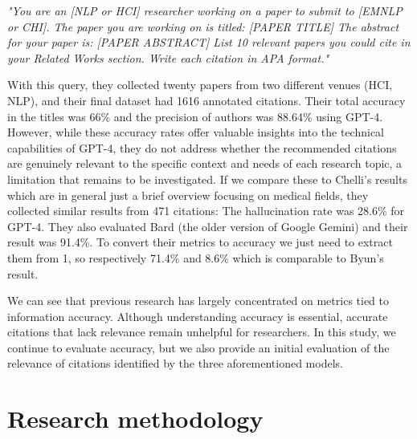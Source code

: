\documentclass[runningheads]{llncs}
\begin{document}
\textit{"You are an [NLP or HCI] researcher working on a paper to submit to [EMNLP or CHI]. 
The paper you are working on is titled: [PAPER TITLE] The abstract for your paper is: [PAPER ABSTRACT]
List 10 relevant papers you could cite in your Related Works section. Write each citation in APA format."}

With this query, they collected twenty papers from two different venues (HCI, NLP), and their final dataset had 1616 annotated citations. Their total accuracy in the titles was 66\% and the precision of authors was 88.64\% using GPT-4. However, while these accuracy rates offer valuable insights into the technical capabilities of GPT-4, they do not address whether the recommended citations are genuinely relevant to the specific context and needs of each research topic, a limitation that remains to be investigated. If we compare these to Chelli's results which are in general just a brief overview focusing on medical fields, they collected similar results from 471 citations: The hallucination rate was 28.6\% for GPT-4. They also evaluated Bard (the older version of Google Gemini) and their result was 91.4\%. To convert their metrics to accuracy we just need to extract them from 1, so respectively 71.4\% and 8.6\% which is comparable to Byun's result.

We can see that previous research has largely concentrated on metrics tied to information accuracy. Although understanding accuracy is essential, accurate citations that lack relevance remain unhelpful for researchers. In this study, we continue to evaluate accuracy, but we also provide an initial evaluation of the relevance of citations identified by the three aforementioned models.

\section{Research methodology}

\end{document}
